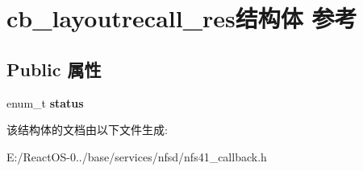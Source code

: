 \hypertarget{structcb__layoutrecall__res}{}\section{cb\+\_\+layoutrecall\+\_\+res结构体 参考}
\label{structcb__layoutrecall__res}
\subsection*{Public 属性}
\begin{DoxyCompactItemize}
\item 
\mbox{\label{structcb__layoutrecall__res_a179285b414686d8cd35594c6955fb112}} 
enum\+\_\+t {\bfseries status}
\end{DoxyCompactItemize}


该结构体的文档由以下文件生成\+:\begin{DoxyCompactItemize}
\item 
E\+:/\+React\+O\+S-\/0../base/services/nfsd/nfs41\+\_\+callback.\+h\end{DoxyCompactItemize}

